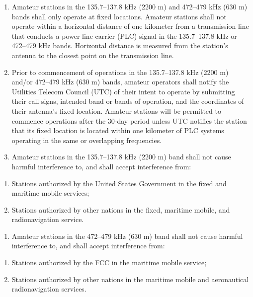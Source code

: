 \documentclass[
  letterpaper,
  DIV=11,
  numbers=noendperiod]{scrreport}
\providecommand{\tightlist}{%
  \setlength{\itemsep}{0pt}\setlength{\parskip}{0pt}}\usepackage{longtable,booktabs,array}
\begin{document}
\begin{enumerate}
\def\labelenumi{(\arabic{enumi})}
\item
  Amateur stations in the 135.7--137.8 kHz (2200 m) and 472--479 kHz
  (630 m) bands shall only operate at fixed locations. Amateur stations
  shall not operate within a horizontal distance of one kilometer from a
  transmission line that conducts a power line carrier (PLC) signal in
  the 135.7--137.8 kHz or 472--479 kHz bands. Horizontal distance is
  measured from the station's antenna to the closest point on the
  transmission line.
\item
  Prior to commencement of operations in the 135.7--137.8 kHz (2200 m)
  and/or 472--479 kHz (630 m) bands, amateur operators shall notify the
  Utilities Telecom Council (UTC) of their intent to operate by
  submitting their call signs, intended band or bands of operation, and
  the coordinates of their antenna's fixed location. Amateur stations
  will be permitted to commence operations after the 30-day period
  unless UTC notifies the station that its fixed location is located
  within one kilometer of PLC systems operating in the same or
  overlapping frequencies.
\item
  Amateur stations in the 135.7--137.8 kHz (2200 m) band shall not cause
  harmful interference to, and shall accept interference from:
\end{enumerate}

\begin{enumerate}
\def\labelenumi{(\roman{enumi})}
\item
  Stations authorized by the United States Government in the fixed and
  maritime mobile services;
\item
  Stations authorized by other nations in the fixed, maritime mobile,
  and radionavigation service.
\end{enumerate}

\begin{enumerate}
\def\labelenumi{(\arabic{enumi})}
\setcounter{enumi}{3}
\tightlist
\item
  Amateur stations in the 472--479 kHz (630 m) band shall not cause
  harmful interference to, and shall accept interference from:
\end{enumerate}

\begin{enumerate}
\def\labelenumi{(\roman{enumi})}
\item
  Stations authorized by the FCC in the maritime mobile service;
\item
  Stations authorized by other nations in the maritime mobile and
  aeronautical radionavigation services.
\end{enumerate}
\end{document}
